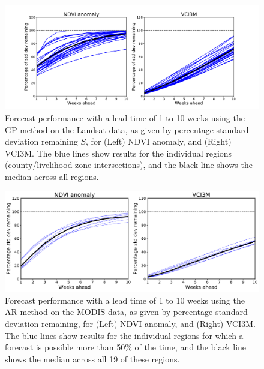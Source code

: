 \documentclass[review]{elsarticle}
\begin{document}
\begin{figure}
	\centering
	\includegraphics[trim = 50mm 0mm 0mm 0mm,width=14 cm]{figures/FC-pref.pdf} 
	\caption{Forecast performance with a lead time of 1 to 10 weeks using the GP method on the Landsat data, as given by percentage standard deviation remaining $S$, for (Left) NDVI anomaly, and (Right) VCI3M. The blue lines show results for the individual regions (county/livelihood zone intersections), and the black line shows the median across all regions.} \label{fig:GP_NDVI_forecast}
\end{figure}

\begin{figure}
	\centering
	\includegraphics[trim = 20mm 0mm 0mm 0mm,width=12.5cm]{figures/NDVI_forecast2.pdf} 
	\caption{Forecast performance with a lead time of 1 to 10 weeks using the AR method on the MODIS data, as given by percentage standard deviation remaining, for (Left) NDVI anomaly, and (Right) VCI3M. The blue lines show results for the individual regions for which a forecast is possible more than 50\% of the time, and the black line shows the median across all 19 of these regions.} \label{fig:NDVI_forecast}
\end{figure}
\end{document}
